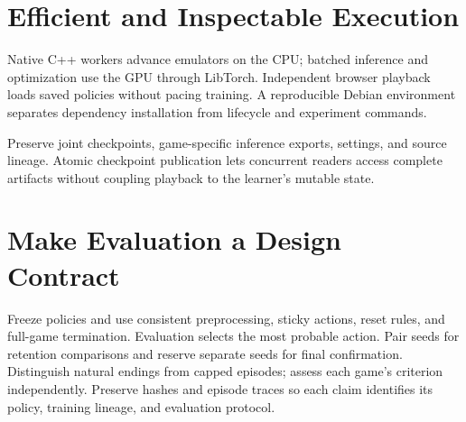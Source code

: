 \section{Efficient and Inspectable Execution}
Native C++ workers advance emulators on the CPU; batched inference and
optimization use the GPU through LibTorch. Independent browser
playback loads saved policies without pacing training. A reproducible
Debian environment separates dependency installation from lifecycle
and experiment commands.

Preserve joint checkpoints, game-specific inference exports, settings,
and source lineage. Atomic checkpoint publication lets concurrent
readers access complete artifacts without coupling playback to
the learner's mutable state.

\section{Make Evaluation a Design Contract}
Freeze policies and use consistent preprocessing, sticky actions,
reset rules, and full-game termination. Evaluation selects the most
probable action. Pair seeds for retention comparisons and reserve
separate seeds for final confirmation. Distinguish natural endings
from capped episodes; assess each game's criterion independently.
Preserve hashes and episode traces so each claim identifies its
policy, training lineage, and evaluation protocol.

\begingroup
\raggedright


\endgroup

